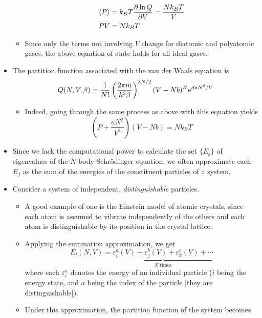 \documentclass[../notes.tex]{subfiles}
\begin{document}
\begin{itemize}
\begin{itemize}
\begin{align*}
            \prb{P} &= k_BT\pdv{\ln Q}{V} = \frac{Nk_BT}{V}\\
            PV &= Nk_BT
        \end{align*}
        \item Since only the terms not involving $V$ change for diatomic and polyatomic gases, the above equation of state holds for all ideal gases.
    \end{itemize}
    \item The partition function associated with the van der Waals equation is
    \begin{equation*}
        Q(N,V,\beta) = \frac{1}{N!}\left( \frac{2\pi m}{h^2\beta} \right)^{3N/2}(V-Nb)^N\e[\beta aN^2/V]
    \end{equation*}
    \begin{itemize}
        \item Indeed, going through the same process as above with this equation yields
        \begin{equation*}
            \left( P+\frac{aN^2}{V^2} \right)(V-Nb) = Nk_BT
        \end{equation*}
    \end{itemize}
    \item Since we lack the computational power to calculate the set $\{E_j\}$ of eigenvalues of the $N$-body Schr\"{o}dinger equation, we often approximate each $E_j$ as the sum of the energies of the constituent particles of a system.
    \item Consider a system of independent, \emph{distinguishable} particles.
    \begin{itemize}
        \item A good example of one is the Einstein model of atomic crystals, since each atom is assumed to vibrate independently of the others and each atom is distinguishable by its position in the crystal lattice.
        \item Applying the summation approximation, we get
        \begin{equation*}
            E_l(N,V) = \underbrace{\varepsilon_i^a(V)+\varepsilon_j^b(V)+\varepsilon_k^c(V)+\cdots}_{N\text{ times}}
        \end{equation*}
        where each $\varepsilon_i^a$ denotes the energy of an individual particle ($i$ being the energy state, and $a$ being the index of the particle [they are distinguishable]).
        \item Under this approximation, the partition function of the system becomes
        \begin{equation*}

\end{equation*}
\end{itemize}
\end{itemize}
\end{document}
